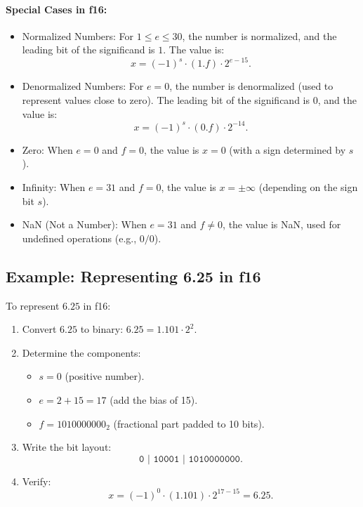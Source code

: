 \paragraph{Special Cases in f16:}
\begin{itemize}
    \item Normalized Numbers: For \( 1 \leq e \leq 30 \), the number is normalized, and the leading bit of the significand is \( 1 \). The value is:
    \[
    x = (-1)^s \cdot (1.f) \cdot 2^{e - 15}.
    \]
    \item Denormalized Numbers: For \( e = 0 \), the number is denormalized (used to represent values close to zero). The leading bit of the significand is \( 0 \), and the value is:
    \[
    x = (-1)^s \cdot (0.f) \cdot 2^{-14}.
    \]
    \item Zero: When \( e = 0 \) and \( f = 0 \), the value is \( x = 0 \) (with a sign determined by \( s \)).
    \item Infinity: When \( e = 31 \) and \( f = 0 \), the value is \( x = \pm \infty \) (depending on the sign bit \( s \)).
    \item NaN (Not a Number): When \( e = 31 \) and \( f \neq 0 \), the value is NaN, used for undefined operations (e.g., \( 0/0 \)).
\end{itemize}

\subsection{Example: Representing 6.25 in f16}

To represent \( 6.25 \) in f16:
\begin{enumerate}
    \item Convert \( 6.25 \) to binary: \( 6.25 = 1.101 \cdot 2^2 \).
    \item Determine the components:
    \begin{itemize}[noitemsep]
        \item \( s = 0 \) (positive number).
        \item \( e = 2 + 15 = 17 \) (add the bias of 15).
        \item \( f = 1010000000_2 \) (fractional part padded to 10 bits).
    \end{itemize}
    \item Write the bit layout:
    \[
    \texttt{0 | 10001 | 1010000000}.
    \]
    \item Verify:
    \[
    x = (-1)^0 \cdot (1.101) \cdot 2^{17 - 15} = 6.25.
    \]
\end{enumerate}


